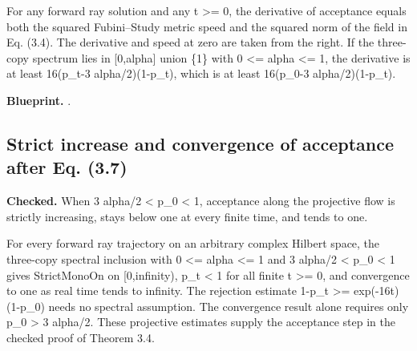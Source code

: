 For any forward ray solution and any t >= 0, the derivative of acceptance equals both the squared Fubini–Study metric speed and the squared norm of the field in Eq. (3.4). The derivative and speed at zero are taken from the right. If the three-copy spectrum lies in [0,alpha] union \{1\} with 0 <= alpha <= 1, the derivative is at least 16(p\_t-3 alpha/2)(1-p\_t), which is at least 16(p\_0-3 alpha/2)(1-p\_t).


\textbf{Blueprint.} .

\subsection{Strict increase and convergence of acceptance after Eq. (3.7)}\label{paper:flow-acceptance-limit}
\textbf{Checked.} When 3 alpha/2 < p\_0 < 1, acceptance along the projective flow is strictly increasing, stays below one at every finite time, and tends to one. 

For every forward ray trajectory on an arbitrary complex Hilbert space, the three-copy spectral inclusion with 0 <= alpha <= 1 and 3 alpha/2 < p\_0 < 1 gives StrictMonoOn on [0,infinity), p\_t < 1 for all finite t >= 0, and convergence to one as real time tends to infinity. The rejection estimate 1-p\_t >= exp(-16t)(1-p\_0) needs no spectral assumption. The convergence result alone requires only p\_0 > 3 alpha/2. These projective estimates supply the acceptance step in the checked proof of Theorem 3.4.

